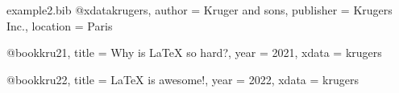 \begin{example}[standalone,
  biber,
  paperwidth=5cm,
  paperheight=7cm,
  minted_language=bibtex,
]
\begin{filecontents}{example2.bib} 
@xdata{krugers,
  author    = {Kruger {and} sons},
  publisher = {Krugers Inc.},
  location  = {Paris}
}

@book{kru21,
  title = {Why is \LaTeX{} so hard?},
  year  = {2021},
  xdata = {krugers}
}

@book{kru22,
  title = {\LaTeX{} is awesome!},
  year  = {2022},
  xdata = {krugers}
}
\end{filecontents} %
\usepackage{biblatex}

\sloppy

\nocite{*}
\noindent
\printbibliography

\end{example}
